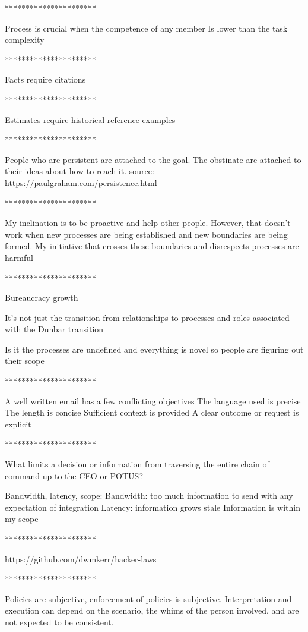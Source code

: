 **********************

Process is crucial when the competence of any member Is lower than the task complexity

**********************

Facts require citations 

**********************

Estimates require historical reference examples

**********************

People who are persistent are attached to the goal. The obstinate are attached to their ideas about how to reach it.
source: https://paulgraham.com/persistence.html

**********************

My inclination is to be proactive and help other people. However, that doesn't work when new processes are being established and new boundaries are being formed. My initiative that crosses these boundaries and disrespects processes are harmful

**********************

Bureaucracy growth

It's not just the transition from relationships to processes and roles associated with the Dunbar transition 

Is it the processes are undefined and everything is novel so people are figuring out their scope

**********************

A well written email has a few conflicting objectives 
The language used is precise 
The length is concise 
Sufficient context is provided 
A clear outcome or request is explicit 


**********************

What limits a decision or information from traversing the entire chain of command up to the CEO or POTUS?

Bandwidth, latency, scope:
Bandwidth: too much information to send with any expectation of integration 
Latency: information grows stale 
Information is within my scope



**********************

https://github.com/dwmkerr/hacker-laws

**********************

Policies are subjective, enforcement of policies is subjective. Interpretation and execution can depend on the scenario, the whims of the person involved, and are not expected to be consistent.

